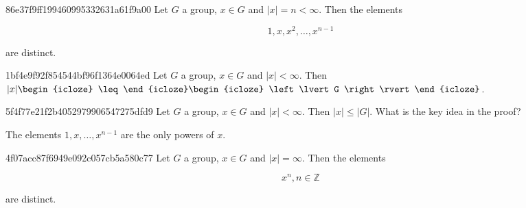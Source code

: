 \begin{note}{86e37f9ff199460995332631a61f9a00}
    Let \({ G }\) a group, \({ x \in G }\) and \({ \lvert x \rvert = n < \infty }\).
    Then the elements
    \begin{icloze}{2}
        \[
            1, x, x^2, \ldots, x^{n-1}
        \]
    \end{icloze}
    \begin{icloze}{1}are distinct.\end{icloze}
\end{note}

\begin{note}{1bf4e9f92f854544bf96f1364e0064ed}
    Let \({ G }\) a group, \({ x \in G }\) and \({ \lvert x \rvert < \infty }\).
    Then \({ \lvert x \rvert \begin{icloze}{2}\leq\end{icloze} \begin{icloze}{1}\left\lvert G \right\rvert\end{icloze} }\).
\end{note}

\begin{note}{5f4f77e21f2b4052979906547275dfd9}
    Let \({ G }\) a group, \({ x \in G }\) and \({ \lvert x \rvert < \infty }\).
    Then \({ \lvert x \rvert \leq \left\lvert G \right\rvert }\).
    What is the key idea in the proof?

    \begin{cloze}{1}
        The elements \({ 1, x, \ldots, x^{n - 1} }\) are the only powers of \({ x }\).
    \end{cloze}
\end{note}

\begin{note}{4f07acc87f6949e092c057cb5a580c77}
    Let \({ G }\) a group, \({ x \in G }\) and \({ \lvert x \rvert = \infty }\).
    Then the elements
    \begin{icloze}{2}
        \[
            x^{n}, n \in \mathbb Z
        \]
    \end{icloze}
    \begin{icloze}{1}are distinct.\end{icloze}
\end{note}

